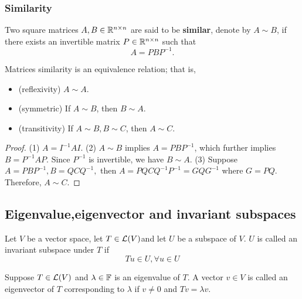 \begin{refsection}
\subsubsection{Similarity}

\begin{definition}
Two square matrices $A,B\in \mathbb{R}^{n\times n}$ are said to be \textbf{similar}, denote by $A\sim B$, if there exists an invertible matrix $P\in \mathbb{R}^{n\times n}$ such that
$$A = PBP^{-1}.$$	
\end{definition}

\begin{lemma}
Matrices similarity is an equivalence relation; that is, 	
\begin{itemize}
	\item (reflexivity) $A\sim A$.
	\item (symmetric) If $A\sim B$, then $B\sim A$.
	\item (transitivity) If $A\sim B, B\sim C$, then $A\sim C$.
\end{itemize}	
\end{lemma}
\begin{proof}
(1) $A = I^{-1}AI$.
(2) $A \sim B$ implies $A = PBP^{-1}$, which further implies $B = P^{-1}AP$. Since $P^{-1}$ is invertible, we have
$B\sim A$.
(3) Suppose
$A = PBP^{-1}, B = QCQ^{-1}, $
then $A = PQCQ^{-1}P^{-1} = GQG^{-1}$ where $G = PQ$. Therefore, $A\sim C$.
\end{proof}

\subsection{Eigenvalue,eigenvector and invariant subspaces}

\begin{definition}\cite[132]{axler2015linear}
Let $V$ be a vector space, let $T\in \mathcal{L}(V)$and let $U$ be a subspace of $V$. $U$ is called an invariant subspace under $T$ if
$$Tu\in U,\forall u\in U$$
\end{definition}

\begin{definition}\cite[134]{axler2015linear}
Suppose $T\in \mathcal{L}(V)$ and $\lambda \in \mathbb{F}$ is an eigenvalue of $T$. A vector $v\in V$ is called an eigenvector of $T$ corresponding to $\lambda$ if $v\neq 0$ and $Tv = \lambda v$.
\end{definition}


\end{refsection}
